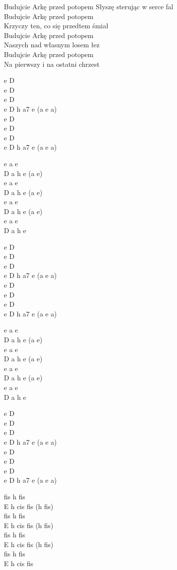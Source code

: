\begin{text}
    Budujcie Arkę przed potopem
    Słyszę sterując w serce fal\\
    Budujcie Arkę przed potopem\\
    Krzyczy ten, co się przedtem śmiał\\
    Budujcie Arkę przed potopem\\
    Naszych nad własnym losem łez\\
    Budujcie Arkę przed potopem\\
    Na pierwszy i na ostatni chrzest
\end{text}
\begin{chord}
    e D\\
    e D\\
    e D\\
    e D h a7 e (a e a)\\
    e D\\
    e D\\
    e D\\
    e D h a7 e (a e a)

    e a e\\
    D a h e (a e)\\
    e a e\\
    D a h e (a e)\\
    e a e\\
    D a h e (a e)\\
    e a e\\
    D a h e

    e D\\
    e D\\
    e D\\
    e D h a7 e (a e a)\\
    e D\\
    e D\\
    e D\\
    e D h a7 e (a e a)

    e a e\\
    D a h e (a e)\\
    e a e\\
    D a h e (a e)\\
    e a e\\
    D a h e (a e)\\
    e a e\\
    D a h e

    e D\\
    e D\\
    e D\\
    e D h a7 e (a e a)\\
    e D\\
    e D\\
    e D\\
    e D h a7 e (a e a)

    fis h fis\\
    E h cis fis (h fis)\\
    fis h fis\\
    E h cis fis (h fis)\\
    fis h fis\\
    E h cis fis (h fis)\\
    fis h fis\\
    E h cis fis
\end{chord}